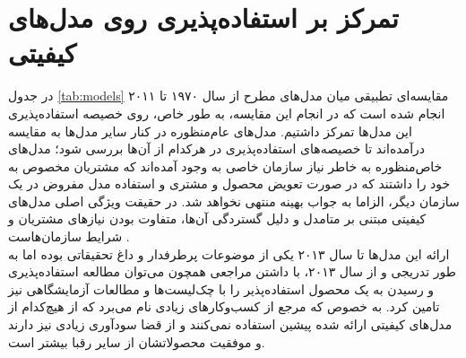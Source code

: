 \section{تمرکز بر استفاده‌پذیری روی مدل‌های کیفیتی}
در جدول
\ref{tab:models}
مقایسه‌ای تطبیقی میان مدل‌های مطرح از سال ۱۹۷۰ تا ۲۰۱۱ انجام شده است که در انجام این مقایسه، به طور خاص، روی خصیصه استفاده‌پذیری این مدل‌ها تمرکز داشتیم. مدل‌های عام‌منظوره در کنار سایر مدل‌ها به مقایسه درآمده‌اند تا خصیصه‌های استفاده‌پذیری در هرکدام از آن‌ها بررسی شود؛ مدل‌های خاص‌منظوره به خاطر نیاز سازمان خاصی به وجود آمده‌اند که مشتریان مخصوص به خود را داشتند که در صورت تعویض محصول و مشتری و استفاده مدل مفروض در یک سازمان دیگر، الزاما به جواب بهینه منتهی نخواهد شد. در حقیقت ویژگی اصلی مدل‌های کیفیتی مبتنی بر متامدل و دلیل گستردگی آن‌ها، متفاوت بودن نیازهای مشتریان و شرایط سازمان‌هاست
\cite{sommerville_software_2016}.\\
ارائه این مدل‌ها تا سال ۲۰۱۳ یکی از موضوعات پرطرفدار و داغ تحقیقاتی بوده اما به طور تدریجی و از سال ۲۰۱۳، با داشتن مراجعی همچون
\cite{albert_measuring_2013}
می‌توان مطالعه استفاده‌پذیری و رسیدن به یک محصول استفاده‌پذیر را با چک‌لیست‌ها و مطالعات آزمایشگاهی نیز تامین کرد. به خصوص که مرجع
\cite{wagner_software_2012}
از کسب‌وکارهای زیادی نام می‌برد که از هیچ‌کدام از مدل‌های کیفیتی ارائه شده پیشین استفاده نمی‌کنند و از قضا سودآوری زیادی نیز دارند و موفقیت محصولاتشان از سایر رقبا بیشتر است.
